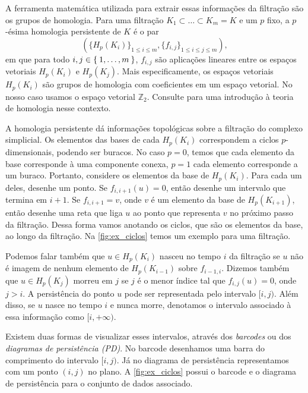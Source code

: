 A ferramenta matemática utilizada para extrair essas informações da filtração
são os grupos de homologia. Para uma filtração $K_1 \subset \dots \subset K_m=K$ e um
$p$ fixo, a $p$-ésima homologia persistente de $K$ é o par
\begin{equation}
  \label{eq:seq_hom}
  \left( \{H_p(K_i)\}_{1\leq i \leq m}, \{f_{i,j}\}_{1\leq i \leq j \leq m} \right),
\end{equation}
em que para todo $i,j \in \Set{1,\dots,m}$, $f_{i,j}$ são aplicações lineares
entre os espaços vetoriais $H_p(K_i)$ e $H_p(K_j)$. Mais especificamente,
os espaços vetoriais $H_p(K_i)$ são grupos de homologia com coeficientes
em um espaço vetorial. No nosso caso usamos o espaço vetorial $\mathbb{Z}_2$.
Consulte \cite{edelsbrunner2010computational} para uma introdução à teoria de homologia nesse contexto.

A homologia persistente dá informações topológicas sobre a filtração do complexo simplicial.
Os elementos das bases de cada $H_p(K_i)$ correspondem a ciclos $p$-dimensionais,
podendo ser buracos. No caso $p=0$, temos que cada elemento da base corresponde
à uma componente conexa, $p=1$ cada elemento corresponde a um buraco.
Portanto, considere os elementos da base de $H_p(K_i)$. Para cada um deles,
desenhe um ponto. Se $f_{i,i+1}(u)=0$, então desenhe um intervalo que termina
em $i+1$. Se $f_{i,i+1}=v$, onde $v$ é um elemento da base de $H_p(K_{i+1})$,
então desenhe uma reta que liga $u$ ao ponto que representa $v$ no próximo passo
da filtração. Dessa forma vamos anotando os ciclos, que são os elementos da base,
ao longo da filtração. Na \autoref{fig:ex_ciclos} temos um exemplo para uma filtração.

Podemos falar também que $u\in H_p(K_i)$ nasceu no tempo $i$ da filtração se
$u$ não é imagem de nenhum elemento de $H_p(K_{i-1})$ sobre $f_{i-1,i}$.
Dizemos também que $u \in H_p(K_j)$ morreu em $j$ se $j$ é o menor índice tal que
$f_{i,j}(u) = 0$, onde $j>i$. A persistência do ponto $u$ pode ser representada pelo intervalo
$[i,j)$. Além disso, se $u$ nasce no tempo $i$ e nunca morre, denotamos o intervalo
associado à essa informação como $[i, +\infty)$.

Existem duas formas de visualizar esses intervalos, através dos
\textit{barcodes} ou dos \textit{diagramas de persistência (PD)}. No barcode
desenhamos uma barra do comprimento do intervalo $[i,j)$. Já no diagrama de
persistência representamos com um ponto $(i,j)$ no plano. A \autoref{fig:ex_ciclos}
possui o barcode e o diagrama de persistência para o conjunto de dados associado.

